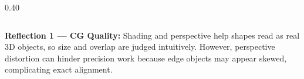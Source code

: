 \documentclass[aspectratio=169]{beamer}
\newcommand{\reflectionbox}[2]{%
  \begin{tcolorbox}[
    colback=lightbg,
    colframe=borderc,
    boxrule=0.5pt,
    arc=2pt,
    left=7pt,
    right=7pt,
    top=3pt,
    bottom=3pt
  ]
    \scriptsize
    \textbf{\color{darktext}#1}
    {\color{graytext}#2}
  \end{tcolorbox}
}
\begin{document}
\begin{frame}[t]
\begin{columns}[t]
\begin{column}{0.40\textwidth}
\end{column}

\end{columns}

\vfill


\reflectionbox
{Reflection 1 --- CG Quality: }
{Shading and perspective help shapes read as real 3D objects, so size and overlap are judged intuitively.
However, perspective distortion can hinder precision work because edge objects may appear skewed, complicating exact alignment.}

\end{frame}
\end{document}
